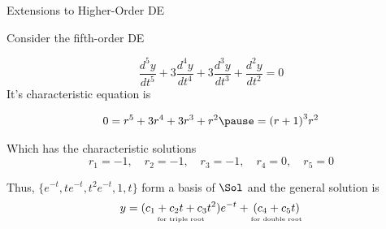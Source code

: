 \documentclass{beamer}
\begin{document}
\begin{frame}{Extensions to Higher-Order DE}
\begin{example}
Consider the fifth-order DE

\vspace{-1mm}
\begin{equation*}
\dfrac{d^5y}{dt^5}
+3\dfrac{d^4y}{dt^4}
+3\dfrac{d^3y}{dt^3}
+\dfrac{d^2y}{dt^2}
=0
\end{equation*}\pause
It's characteristic equation is

\vspace{-1mm}
\begin{equation*}
\begin{aligned}
0=r^5+3r^4+3r^3+r^2\pause
={(r+1)}^3r^2
\end{aligned}
\end{equation*}\pause

\vspace{-3mm}
Which has the characteristic solutions
\begin{equation*}
r_1=-1,\quad
r_2=-1,\quad
r_3=-1,\quad
r_4=0,\quad
r_5=0
\end{equation*}\pause

\vspace{-3mm}
Thus, $\{e^{-t},te^{-t},t^2e^{-t},1,t\}$ form a basis of $\Sol$ and the general solution is
\begin{equation*}
y=\underset{\text{\tiny for triple root}}{(c_1+c_2t+c_3t^2)}e^{-t}
 +\underset{\text{\tiny for double root}}{(c_4+c_5t)}
\end{equation*}
\end{example}
\end{frame}
\end{document}
